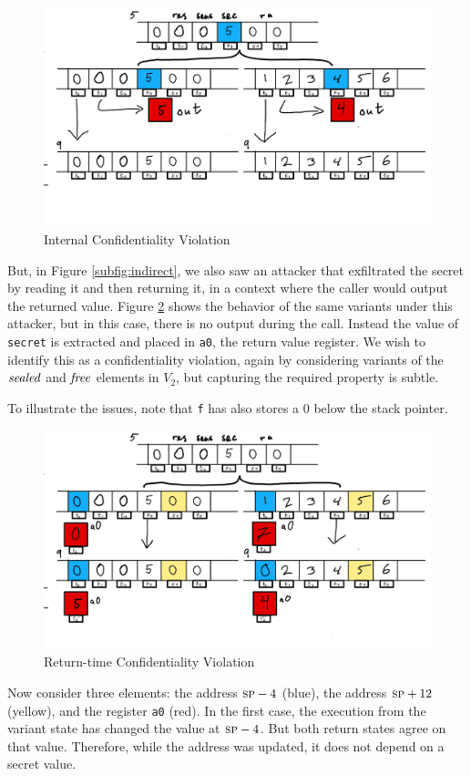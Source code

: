 \documentclass[10pt,conference]{ieeetran}%
\theoremstyle{definition}
\begin{document}
\begin{figure}
  \includegraphics[width=\columnwidth]{variants2.png}
  \caption{Internal Confidentiality Violation}
  \label{fig:variant2}
\end{figure}

But, in Figure \ref{subfig:indirect}, we also saw an attacker that exfiltrated the secret
by reading it and then returning it, in a context where the caller would output the returned
value. Figure \ref{fig:variant3} shows the behavior of the same variants under this attacker,
but in this case, there is no output during the call. Instead the value of {\tt secret} is
extracted and placed in {\tt a0}, the return value register. We wish to identify this as
a confidentiality violation, again by considering variants of the \(\mathit{sealed}\) and \(\mathit{free}\)
elements in \(V_2\), but capturing the required property is subtle.  

To illustrate the issues, note that {\tt f} has also stores a 0 below the stack pointer.
%
\begin{figure}
  \includegraphics[width=\columnwidth]{variants3.png}
  \caption{Return-time Confidentiality Violation}
  \label{fig:variant3}
\end{figure}
%
Now consider three elements: the address \(\textsc{sp} - 4\) (blue), the address \(\textsc{sp} + 12\) (yellow),
and the register {\tt a0} (red). In the first case, the execution from the variant state
has changed the value at \(\textsc{sp} - 4\). But both return states agree on that value. Therefore,
while the address was updated, it does not depend on a secret value.
\end{document}
